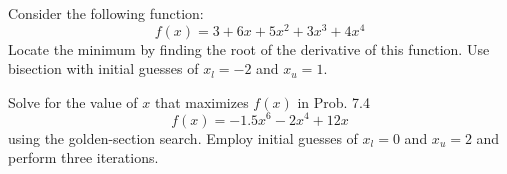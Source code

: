 \documentclass{article}
\begin{document}
\setcounter{problem}{2}
\begin{problem}
Consider the following function:
\[ f(x) = 3 + 6x + 5x^{2} + 3x^{3} + 4x^{4} \]
Locate the minimum by finding the root of the derivative of this function. Use bisection with initial guesses of $x_{l} = -2$ and $x_{u} = 1$.
\end{problem}

\setcounter{problem}{4}
\begin{problem}
Solve for the value of $x$ that maximizes $f(x)$ in Prob. 7.4 
\[ f(x) = -1.5x^{6} - 2x^{4} + 12x \]
using the golden-section search. Employ initial guesses of $x_{l} = 0$ and $x_{u} = 2$ and perform three iterations. 
\end{problem}
\end{document}

